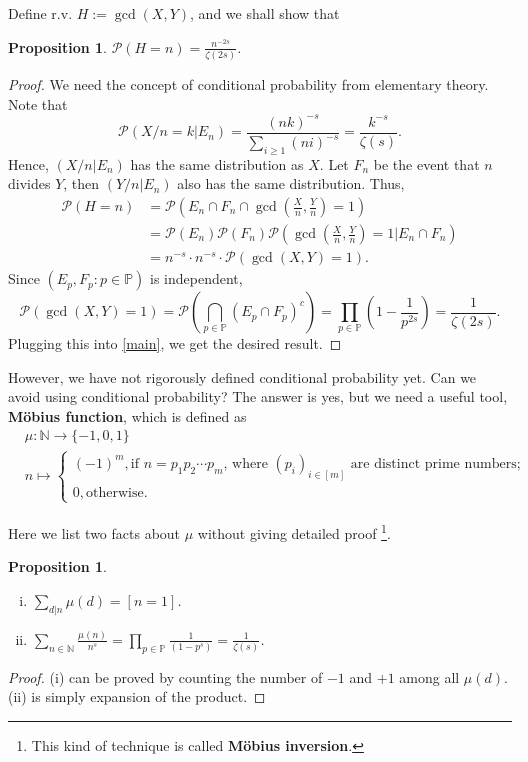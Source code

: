 \documentclass[12pt]{article}
\newtheorem{proposition}[theorem]{Proposition}
\newcommand\N{\mathbb{N}}
\newcommand\pp{\mathcal{P}}
\newcommand\PP{\mathbb{P}}
\newcommand\pr[1]{\mathcal{P} \left( #1\right)}
\begin{document}
Define r.v. $H := \gcd(X,Y)$, and we shall show that
\begin{proposition} \label{gcd}
    $\pp(H = n) = \frac{n^{-2s}}{\zeta(2s)}$.
\end{proposition}
\begin{proof}
    We need the concept of conditional probability 
    from elementary theory. Note that 
    $$
        \pr{X/n = k| E_n}
        = \frac{(nk)^{-s}}{\sum_{i \geq 1}(ni)^{-s}} 
        = \frac{k^{-s}}{\zeta(s)}.
    $$
    Hence, $(X/n | E_n)$ has the same distribution as $X$.
    Let $F_n$ be the event that $n$ divides $Y$, 
    then $(Y/n|E_n)$ also has the same distribution.
    Thus,
    \begin{equation} \label{main}
    \begin{aligned}
        \pp(H = n) &= \pr{E_n \cap F_n \cap {\gcd (\frac{X}{n},\frac{Y}{n}) = 1}} \\
         &= \pp(E_n) \pp(F_n) \pr{\gcd (\frac{X}{n},\frac{Y}{n}) = 1 | E_n \cap F_n} \\
         &= n^{-s} \cdot n^{-s} \cdot \pp(\gcd(X,Y) = 1).
    \end{aligned}
    \end{equation}
    Since $(E_p,F_p: p\in\PP)$ is independent, 
    $$
        \pp(\gcd(X,Y) = 1) = \pp(\bigcap_{p \in \PP}(E_p \cap F_p)^c)
        = \prod_{p\in \PP} (1 - \frac{1}{p^{2s}}) = \frac{1}{\zeta(2s)}.
    $$
    Plugging this into \cref{main}, we get the desired result.
\end{proof}

However, we have not rigorously defined conditional probability yet.
Can we avoid using conditional probability?
The answer is yes, but we need a useful tool, \textbf{Möbius function},
which is defined as 
\begin{align*}
    &\mu : \N \to \{-1,0,1\} \\
     &n \mapsto \begin{cases}
        (-1)^{m}, \text{if $n = p_1p_2\cdots p_m$, where $(p_i)_{i \in [m]}$ are distinct prime numbers};\\
        0, \text{otherwise}.
    \end{cases}
\end{align*}

Here we list two facts about $\mu$ without giving detailed proof
\footnote{This kind of technique is called \textbf{Möbius inversion}.}.
\begin{proposition} \label{mu} 
    \begin{enumerate}[(i)]
        \item $\sum_{d|n} \mu(d) = [n = 1]$.
        \item $\sum_{n \in \N} \frac{\mu(n)}{n^s} 
        = \prod_{p \in \PP} \frac{1}{(1 - p^{s})} = \frac{1}{\zeta(s)}$.
    \end{enumerate}
\end{proposition} 
\begin{proof}
    (i) can be proved by counting the number of $-1$ and $+1$
    among all $\mu(d)$. (ii) is simply expansion of the product.
\end{proof}
\end{document}

